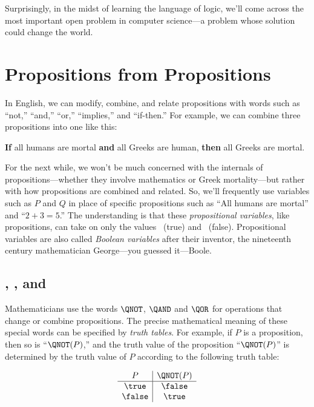 Surprisingly, in the midst of learning the language of logic, we'll come
across the most important open problem in computer science---a problem
whose solution could change the world.

\section{Propositions from Propositions}\label{propform_sec}

In English, we can modify, combine, and relate propositions with words
such as ``not,'' ``and,'' ``or,'' ``implies,'' and ``if-then.''
For example, we can combine three propositions into one like this:
\begin{center}
\textbf{If} all humans are mortal \textbf{and} all Greeks are human,
\textbf{then} all Greeks are mortal.
\end{center}

For the next while, we won't be much concerned with the internals of
propositions---whether they involve mathematics or Greek mortality---but
rather with how propositions are combined and related.  So, we'll
frequently use variables such as $P$ and $Q$ in place of specific
propositions such as ``All humans are mortal'' and ``$2 + 3 = 5$.''  The
understanding is that these \emph{propositional variables},
 like propositions, can 
take on only the values \true~(true) and \false~(false).
Propositional variables are also called \emph{Boolean variables}
after their inventor, the nineteenth century mathematician
George---you guessed it---Boole.

\subsection{\QNOT, \QAND, and \QOR}
Mathematicians use the words $\QNOT$, $\QAND$ and $\QOR$
for operations that change or combine propositions.  The precise
mathematical meaning of these special words can be specified by
\emph{truth  tables}.  For example, if $P$ is a proposition,
then so is ``$\QNOT(P)$,'' and the truth value of the proposition
``$\QNOT(P)$'' is determined by the truth value of $P$ according to the
following truth table:

\[
\begin{array}{c|c}
P & \QNOT(P) \\ \hline
\true & \false \\
\false & \true \\
\end{array}
\]

